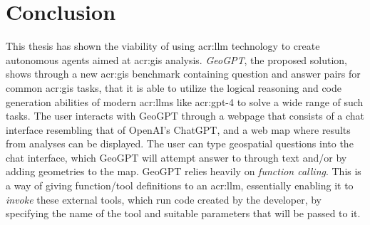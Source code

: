 \chapter{Conclusion}
\label{cha:conclusion}



\begin{comment}
What are the main contributions made to the field?
How significant are these contributions?
Also discuss the contributions in terms of the goals and research questions formulated in the Introduction.

The contributions section will normally contain everything that you address in the abstract, but in an extended form and quite possibly additional issues that cannot be included in the abstract.
An obvious difference is that when the reader has come this far in the text, she/he should be quite familiar with the work, but while reading the abstract they will have little to no knowledge of the work.

The section ``Contributions'' in Chapter~\ref{cha:introduction} differs from this one in that the former is just a list of the main bits, while this section should explain them in more detail.
However, basically the same items should appear in both sections.
\end{comment}

This thesis has shown the viability of using \gls{acr:llm} technology to create autonomous agents aimed at \acrshort{acr:gis} analysis. \textit{GeoGPT}, the proposed solution, shows through a new \acrshort{acr:gis} benchmark containing question and answer pairs for common \acrshort{acr:gis} tasks, that it is able to utilize the logical reasoning and code generation abilities of modern \glspl{acr:llm} like \acrshort{acr:gpt}-4 to solve a wide range of such tasks. The user interacts with GeoGPT through a webpage that consists of a chat interface resembling that of OpenAI's ChatGPT, and a web map where results from analyses can be displayed. The user can type geospatial questions into the chat interface, which GeoGPT will attempt answer to through text and/or by adding geometries to the map. GeoGPT relies heavily on \textit{function calling}. This is a way of giving function/tool definitions to an \acrshort{acr:llm}, essentially enabling it to \textit{invoke} these external tools, which run code created by the developer, by specifying the name of the tool and suitable parameters that will be passed to it.

